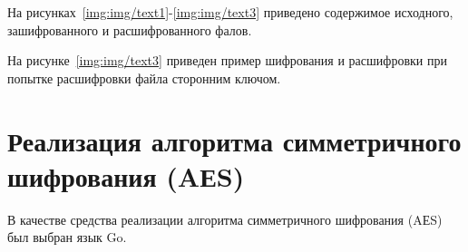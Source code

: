 \clearpage
На рисунках~\ref{img:img/text1}-\ref{img:img/text3} приведено содержимое исходного, зашифрованного и расшифрованного фалов.

\FloatBarrier
{}
\FloatBarrier
{}
\FloatBarrier

\clearpage
На рисунке~\ref{img:img/text3} приведен пример шифрования и расшифровки при попытке расшифровки файла сторонним ключом.
\FloatBarrier
{}
\FloatBarrier

\chapter{Реализация алгоритма симметричного шифрования (AЕS)}
В качестве средства реализации алгоритма симметричного шифрования (AЕS) был выбран язык Go.

